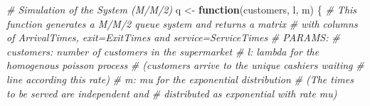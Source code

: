 \documentclass[]{article}
\newenvironment{Shaded}{\begin{snugshade}}{\end{snugshade}}
\newcommand{\CommentTok}[1]{\textcolor[rgb]{0.56,0.35,0.01}{\textit{#1}}}
\newcommand{\ControlFlowTok}[1]{\textcolor[rgb]{0.13,0.29,0.53}{\textbf{#1}}}
\newcommand{\NormalTok}[1]{#1}
\newcommand{\StringTok}[1]{\textcolor[rgb]{0.31,0.60,0.02}{#1}}
\begin{document}
\begin{Shaded}
\begin{Highlighting}[]
\CommentTok{# Simulation of the System (M/M/2)}
\NormalTok{q <-}\StringTok{ }\ControlFlowTok{function}\NormalTok{(customers, l, m) \{}
  \CommentTok{# This function generates a M/M/2 queue system and returns a matrix }
  \CommentTok{# with columns of ArrivalTimes, exit=ExitTimes and service=ServiceTimes}
  \CommentTok{# PARAMS:}
  \CommentTok{# customers:   number of customers in the supermarket}
  \CommentTok{# l:     lambda for the homogenous poisson process }
  \CommentTok{#    (customers arrive to the unique cashiers waiting}
  \CommentTok{#    line according this rate)}
  \CommentTok{# m:     mu for the exponential distribution}
  \CommentTok{#    (The times to be served are independent and }
  \CommentTok{#    distributed as exponential with rate mu)}


\end{Highlighting}
\end{Shaded}
\end{document}
